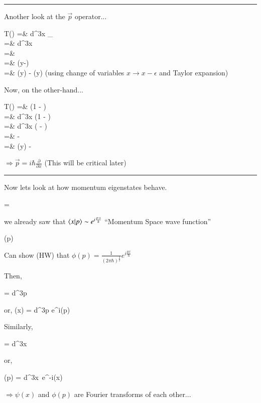 {\noindent\rule{\textwidth}{1pt}

Another look at the $\vec{p}$ operator...


\bea
{}T(\epsilon)\ket{\psi} =& \int d^3x _{}\\
               =& \int d^3x   \\
               =&   \\
               =& \psi(y-\epsilon)  \\
               =& \psi(y) - \epsilon {} \psi(y)
\eea
(using change of variables $x\rightarrow x - \epsilon$ and Taylor expansion)

Now, on the other-hand...

\bea
{}T(\epsilon)\ket{\psi} =&  \left(1 -  \right) \ket{\psi}\\
               =& \int d^3x  \left(1 -  \right) \ket{\psi}\\
               =& \int d^3x  \left(  -  \ket{\psi} \right)\\
               =&    -   \ket{\psi}\\
               =&   \psi(y) -  \epsilon {}  \ket{\psi}\\
\eea


$\Rightarrow \vec{p} = i \hbar \frac{\partial}{\partial x}$
(This will be critical later)

\noindent\rule{\textwidth}{1pt}

Now lets look at how momentum eigenstates behave.

\be
{} = 
\ee

we already saw that $\braket{x|p} \sim e^{i\frac{p\cdot x}{\hbar}}$
``Momentum Space wave function''

\be
\phi(p) \equiv {} 
\ee

Can show (HW) that $\phi(p) = \frac{1}{(2\pi \hbar)^{\frac{3}{2}}} e^{i\frac{px}{\hbar}}$

Then, 

\be
{} = \int d^3p 
\ee

or,
\be
\psi(x) =  \int d^3p e^{i}\phi(p)
\ee

Similarly,

\be
{} = \int d^3x 
\ee

or,

\be
\phi(p) =  \int d^3x\ e^{-i}\psi(x)
\ee


$\Rightarrow \psi(x)$ and $\phi(p)$ are Fourier transforms of each other...


} 


